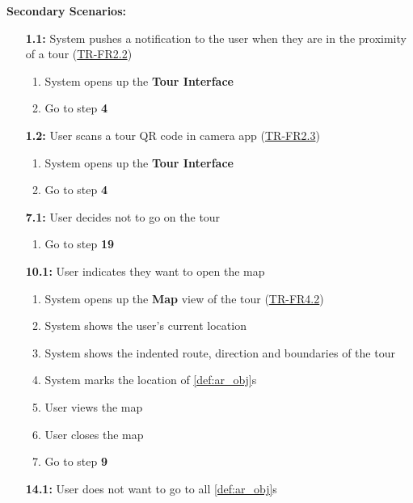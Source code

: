 \documentclass{article}
\begin{document}
\begin{enumerate}[label=\textbf{UC\arabic*}]
        \textbf{Secondary Scenarios:} 
        \begin{itemize}
            \item[{\bf 1.1:}] System pushes a notification to the user when they are in the proximity of a tour (\hyperref[ssub:touring]{TR-FR2.2})
            \begin{enumerate}[label=\textbf{\arabic*.}]
                \item System opens up the \textbf{Tour Interface}
                \item Go to step \textbf{4}
            \end{enumerate}
            \item[{\bf 1.2:}] User scans a tour QR code in camera app (\hyperref[ssub:touring]{TR-FR2.3})
            \begin{enumerate}[label=\textbf{\arabic*.}]
                \item System opens up the \textbf{Tour Interface}
                \item Go to step \textbf{4}
            \end{enumerate}
            \item[{\bf 7.1:}] User decides not to go on the tour
            \begin{enumerate}[label=\textbf{\arabic*.}]
                \item Go to step \textbf{19}
            \end{enumerate}
            \item[{\bf 10.1:}] User indicates they want to open the map
            \begin{enumerate}[label=\textbf{\arabic*.}]
                \item System opens up the \textbf{Map} view of the tour (\hyperref[ssub:touring]{TR-FR4.2})
                \item System shows the user’s current location
                \item System shows the indented route, direction and boundaries of the tour
                \item System marks the location of \ref{def:ar_obj}s
                \item User views the map
                \item User closes the map
                \item Go to step \textbf{9}
            \end{enumerate}
            \item[{\bf 14.1:}] User does not want to go to all \ref{def:ar_obj}s

\end{itemize}
\end{enumerate}
\end{document}
